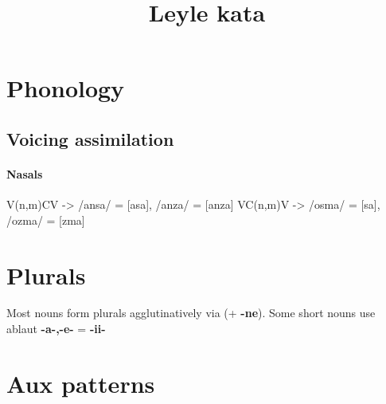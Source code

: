 \documentclass[9pt]{amsart}
\title{Leyle kata}
\begin{document}
\newcommand{\auxthreesg}{the }
\maketitle


\section{Phonology}

\subsection{Voicing assimilation}

\paragraph{Nasals}

\begin{exe}
\ex V(n,m)CV -> /ansa/ = [asa], /anza/ = [anza]
\ex VC(n,m)V -> /osma/ = [\textopeno sa], /ozma/ = [\textopeno zma] 
\end{exe}


\section{Plurals}
Most nouns form plurals agglutinatively via (+ \textbf{-ne}). Some short nouns use ablaut \textbf{-a-,-e-} = \textbf{-ii-}



\section{Aux patterns}
\end{document}
